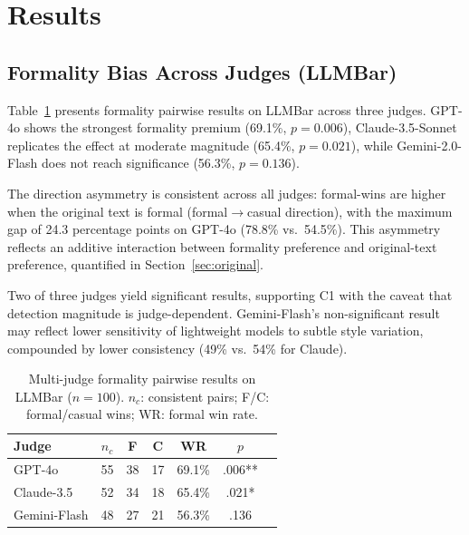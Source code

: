 \documentclass[11pt,a4paper]{article}
\begin{document}
\section{Results}
\label{sec:results}

\subsection{Formality Bias Across Judges (LLMBar)}
\label{sec:multijudge}

Table~\ref{tab:multijudge} presents formality pairwise results on LLMBar across three judges.
GPT-4o shows the strongest formality premium (69.1\%, $p{=}0.006$), Claude-3.5-Sonnet replicates the effect at moderate magnitude (65.4\%, $p{=}0.021$), while Gemini-2.0-Flash does not reach significance (56.3\%, $p{=}0.136$).

The direction asymmetry is consistent across all judges: formal-wins are higher when the original text is formal (formal$\rightarrow$casual direction), with the maximum gap of 24.3 percentage points on GPT-4o (78.8\% vs.\ 54.5\%).
This asymmetry reflects an additive interaction between formality preference and original-text preference, quantified in Section~\ref{sec:original}.

Two of three judges yield significant results, supporting C1 with the caveat that detection magnitude is judge-dependent.
Gemini-Flash's non-significant result may reflect lower sensitivity of lightweight models to subtle style variation, compounded by lower consistency (49\% vs.\ 54\% for Claude).

\begin{table}[t]
\centering
\small
\begin{tabular}{lcccccc}
\toprule
\textbf{Judge} & $n_c$ & \textbf{F} & \textbf{C} & \textbf{WR} & \textbf{$p$} \\
\midrule
GPT-4o & 55 & 38 & 17 & 69.1\% & .006** \\
Claude-3.5 & 52 & 34 & 18 & 65.4\% & .021* \\
Gemini-Flash & 48 & 27 & 21 & 56.3\% & .136 \\
\bottomrule
\end{tabular}
\caption{Multi-judge formality pairwise results on LLMBar ($n{=}100$). $n_c$: consistent pairs; F/C: formal/casual wins; WR: formal win rate.}
\label{tab:multijudge}
\end{table}
\end{document}
